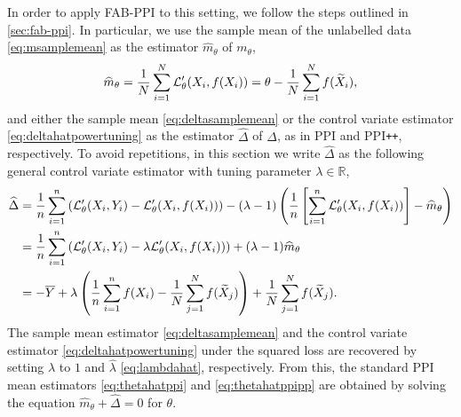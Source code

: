 In order to apply FAB-PPI to this setting, we follow the steps outlined in \cref{sec:fab-ppi}. In particular, we use the sample mean of the unlabelled data \eqref{eq:msamplemean} as the estimator $\widehat{m}_\theta$ of $m_\theta$,
\begin{equation*}
    \widehat{m}_\theta = \frac{1}{N} \sum_{i=1}^N \mathcal{L}_\theta'(X_i, f(X_i)) = \theta - \frac{1}{N}\sum_{i=1}^N f(\widetilde X_i),
\end{equation*}
and either the sample mean \eqref{eq:deltasamplemean} or the control variate estimator \eqref{eq:deltahatpowertuning} as the estimator $\widehat{\Delta}$ of $\Delta$, as in PPI and PPI\texttt{++}, respectively. To avoid repetitions, in this section we write $\widehat{\Delta}$ as the following general control variate estimator with tuning parameter $\lambda \in \mathbb{R}$,
\begin{align*}
    \widehat \Delta&=\frac{1}{n}\sum_{i=1}^n \left(\mathcal{L}_{\theta}'(X_i,Y_i)-\mathcal{L}_{\theta}'(X_i,f(X_i))\right) - (\lambda - 1) \left( \frac{1}{n}\left [\sum_{i=1}^n \mathcal{L}_{\theta}'(X_i,f(X_i))\right ]  -\widehat m_\theta\right) \\
    &= \frac{1}{n}\sum_{i=1}^n \left(\mathcal{L}_{\theta}'(X_i,Y_i)- \lambda \mathcal{L}_{\theta}'(X_i,f(X_i))\right) + (\lambda - 1) \widehat m_\theta \\
    &= -\overline Y + \lambda \left(\frac{1}{n}\sum_{i=1}^n f(X_i) - \frac{1}{N}\sum_{j=1}^N f(\widetilde X_j)\right) + \frac{1}{N}\sum_{j=1}^N f(\widetilde X_j).
\end{align*}
The sample mean estimator \eqref{eq:deltasamplemean} and the control variate estimator \eqref{eq:deltahatpowertuning} under the squared loss are recovered by setting $\lambda$ to $1$ and $\widehat\lambda$ \eqref{eq:lambdahat}, respectively. From this, the standard PPI mean estimators \eqref{eq:thetahatppi} and \eqref{eq:thetahatppipp} are obtained by solving the equation $\widehat m_\theta + \widehat \Delta = 0$ for $\theta$.

